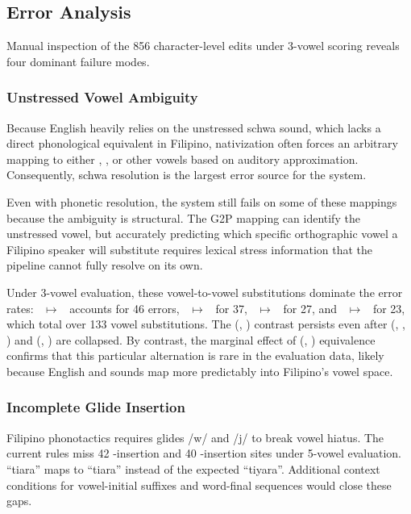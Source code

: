 \subsection{Error Analysis}

Manual inspection of the 856 character-level edits under 3-vowel scoring
reveals four dominant failure modes.

\subsubsection{Unstressed Vowel Ambiguity}

Because English heavily relies on the unstressed schwa sound, which lacks a
direct phonological equivalent in Filipino, nativization often forces an
arbitrary mapping to either , , or other vowels based on auditory
approximation. Consequently, schwa resolution is the largest error source for
the system.

Even with phonetic resolution, the system still fails on some of these mappings
because the ambiguity is structural. The G2P mapping can identify the
unstressed vowel, but accurately predicting which specific orthographic vowel a
Filipino speaker will substitute requires lexical stress information that the
pipeline cannot fully resolve on its own.

Under 3-vowel evaluation, these vowel-to-vowel substitutions dominate the error
rates: ~$\mapsto$~ accounts for 46 errors, ~$\mapsto$~
for 37, ~$\mapsto$~ for 27, and ~$\mapsto$~ for 23,
which total over 133 vowel substitutions. The (, ) contrast
persists even after (, , ) and (, ) are
collapsed. By contrast, the marginal effect of (, ) equivalence
confirms that this particular alternation is rare in the evaluation data,
likely because English  and  sounds map more predictably into
Filipino's vowel space.

\subsubsection{Incomplete Glide Insertion}

Filipino phonotactics requires glides /w/ and /j/ to break vowel hiatus. The
current rules miss 42 -insertion and 40 -insertion sites under
5-vowel evaluation. ``tiara'' maps to ``tiara'' instead of the expected
``tiyara''. Additional context conditions for vowel-initial suffixes and
word-final sequences would close these gaps.

